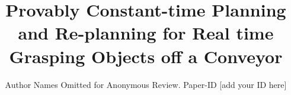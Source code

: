\documentclass[conference]{IEEEtran}
\begin{document}
\title{Provably Constant-time Planning and Re-planning for Real time Grasping Objects off a Conveyor}

\author{Author Names Omitted for Anonymous Review. Paper-ID [add your ID here]}





% 


\maketitle
\end{document}
